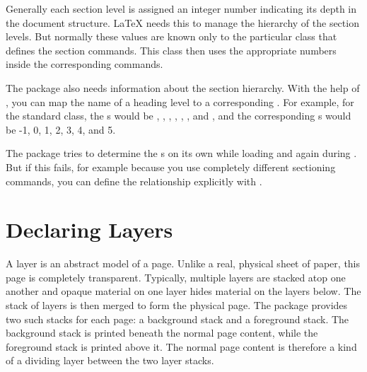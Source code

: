 \begin{Declaration}
\end{Declaration}
Generally each section level is assigned an integer number indicating its
depth in the document structure. \LaTeX{} needs this to manage the hierarchy
of the section levels. But normally these values are known only to the
particular class that defines the section commands. This class then uses the
appropriate numbers inside the corresponding commands.

The  package also needs information about the section
hierarchy. With the help of , you can map the
name of a heading level to a corresponding . For example,
for the standard  class, the s would be
, , , ,
, , and , and the
corresponding s would be -1, 0, 1, 2, 3, 4, and 5.

The  package tries to determine the s on
its own while loading and again during . But
if this fails, for example because you use completely different sectioning
commands, you can define the relationship explicitly with
.%
\EndIndexGroup


\section{Declaring Layers}

A layer is an abstract model of a page. Unlike a real, physical sheet of
paper, this page is completely transparent. Typically, multiple layers are
stacked atop one another and opaque material on one layer hides material on
the layers below. The stack of layers is then merged to form the physical
page. The  package provides two such stacks for each page: a
background stack and a foreground stack. The background stack is printed
beneath the normal page content, while the foreground stack is printed above
it. The normal page content is therefore a kind of a dividing layer between
the two layer stacks.

